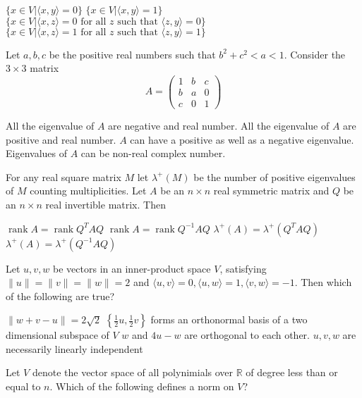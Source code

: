 \documentclass[10pt]{exam}
\DeclareMathOperator{\rank}{\text{rank}}
\begin{document}
\begin{questions}
\begin{checkboxes}
\choice $\{x \in V|\langle x,y \rangle =0 \}$
\choice $\{x \in V|\langle x,y \rangle =1 \}$
\choice $\{x \in V|\langle x,z \rangle =0 \text{ for all $z$ such that }\langle z,y \rangle =0\}$
\choice $\{x \in V|\langle x,z \rangle =1 \text{ for all $z$ such that }\langle z,y \rangle =1\}$
\end{checkboxes}

\question 
Let $a,b,c$ be the positive real numbers such that $b^2+c^2 <a<1$. Consider the $3\times 3$ matrix 
$$A=\begin{pmatrix}
1 & b & c \\ 
b & a & 0 \\ 
c & 0 & 1
\end{pmatrix} $$

\begin{choices}
\choice All the eigenvalue of $A$ are negative and real number.
\choice All the eigenvalue of $A$ are positive and real number.
\choice $A$ can have a positive as well as a negative eigenvalue.
\choice Eigenvalues of $A$ can be non-real complex number.
\end{choices}

\question 
For any real square matrix $M$ let $\lambda^{+}(M)$ be the number of positive eigenvalues of $M$ counting multiplicities. Let $A$ be
an $n\times n$ real symmetric matrix and $Q$ be an $n\times n$ real invertible matrix. Then

\begin{checkboxes}
\choice $\rank A=\rank Q^TAQ$
\choice $\rank A=\rank Q^{-1}AQ$
\choice $\lambda^+(A)=\lambda^+(Q^TAQ)$
\choice $\lambda^+(A)=\lambda^+(Q^{-1}AQ)$
\end{checkboxes}

\question 
Let $u,v, w$ be vectors in an inner-product space $V$, satisfying $\|u\| = \|v \| = \|w \| =2$ and $\langle u, v \rangle = 0, \langle u, w \rangle = 1 ,\langle v, w \rangle = -1 $. Then which of the following are true?

\begin{checkboxes}
\choice $\|w + v - u \| = 2\sqrt{2}$
\choice $\left \{\frac{1}{2}u, \frac{1}{2}v \right \}$ forms an orthonormal basis of a two dimensional subspace of $V$ 
\choice $w$ and $4u - w$ are orthogonal to each other. 
\choice $u, v, w$ are necessarily linearly independent
\end{checkboxes}

\question 
Let $V$ denote the vector space of all polynimials over $\mathbb{R}$ of degree less than or equal to $n$. Which of the following defines a norm on $V$?


\end{questions}
\end{document}
